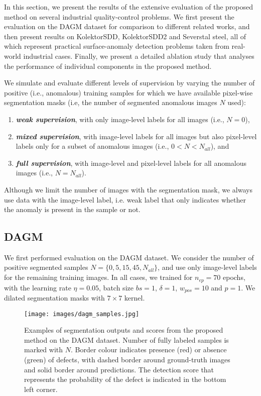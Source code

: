In this section, we present the results of the extensive evaluation of the proposed method on several industrial quality-control problems. We first present the evaluation on the DAGM dataset for comparison to different related works, and then present results on KolektorSDD, KolektorSDD2 and Severstal steel, all of which represent practical surface-anomaly detection problems taken from real-world industrial cases. Finally, we present a detailed ablation study that analyses the performance of individual components in the proposed method.

We simulate and evaluate different levels of supervision by varying the number of positive (i.e., anomalous) training samples for which we have available pixel-wise segmentation masks (i.e, the number of segmented anomalous images $N$ used):

\begin{enumerate}[label=\roman*)]
    \item \textbf{\textit{weak supervision}}, with only image-level labels for all images (i.e., $N=0$),
    \item \textbf{\textit{mixed supervision}}, with image-level labels for all images but also pixel-level labels only for a subset of anomalous images (i.e., $0<N<N_{all}$), and
    \item \textbf{\textit{full supervision}}, with image-level and pixel-level labels for all anomalous images (i.e., $N = N_{all}$).
\end{enumerate}
Although we limit the number of images with the segmentation mask, we always use data with the image-level label, i.e. weak label that only indicates whether the anomaly is present in the sample or not.

\subsection{DAGM}

We first performed evaluation on the DAGM dataset. We consider the number of positive segmented samples $N = \{0, 5, 15, 45, N_{all}\}$, and use only image-level labels for the remaining training images. In all cases, we trained for $n_{ep}=70$ epochs, with the learning rate $\eta=0.05$, batch size $bs=1$, $\delta=1$, $w_{pos}=10$ and $p=1$. We dilated segmentation masks with $7\times7$ kernel. 

\begin{figure}%
    \begin{center}
        \texttt{[image: images/dagm\_samples.jpg]}
    \end{center}
    \caption{Examples of segmentation outputs and scores from the proposed method on the DAGM dataset. Number of fully labeled samples is marked with $N$. Border colour indicates presence (red) or absence (green) of defects, with dashed border around ground-truth images and solid border around predictions. The detection score that represents the probability of the defect is indicated in the bottom left corner. %
    } 
    \label{fig:samples_dagm}
\end{figure}

